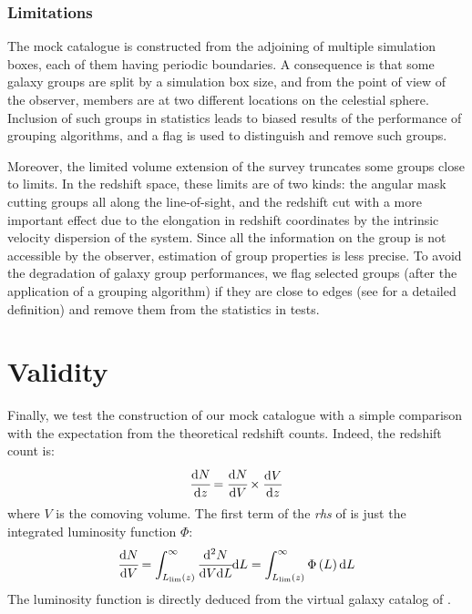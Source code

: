 \subsubsection{Limitations}
\label{ssub:galaxy_samples_limitations}

The mock catalogue is constructed from the adjoining of multiple simulation
boxes, each of them having periodic boundaries. A consequence is that some
galaxy groups are split by a simulation box size, and from the point of view of
the observer, members are at two different locations on the celestial sphere.
Inclusion of such groups in statistics leads to biased results of the
performance of grouping algorithms, and a flag is used to distinguish and
remove such groups.

Moreover, the limited volume extension of the survey truncates some groups
close to limits. In the redshift space, these limits are of two kinds: the
angular mask cutting groups all along the line-of-sight, and the redshift cut
with a more important effect due to the elongation in redshift coordinates by
the intrinsic velocity dispersion of the system. Since all the information on
the group is not accessible by the observer, estimation of group properties is
less precise. To avoid the degradation of galaxy group performances, we flag
selected groups (after the application of a grouping algorithm) if they are
close to edges (see  for a
detailed definition) and remove them from the statistics in tests.

\section{Validity}
\label{sec:validity}

Finally, we test the construction of our mock catalogue with a simple
comparison with the expectation from the theoretical redshift counts. Indeed,
the redshift count is:
%
\begin{equation}
    \label{eq:counts}
    \cfrac{{\rm{d}} N}{{\rm{d}} z} = \cfrac{{\rm{d}} N}{{\rm{d}} V}\times\frac{{\rm{d}} V}{{\rm{d}} z}
\end{equation}
%
where $V$ is the comoving volume.
The first term of the \emph{rhs} of  is just the integrated luminosity function
$\Phi$:
%
\begin{equation}
    \cfrac{{\rm{d}} N}{{\rm{d}} V} = \int_{L_{\lim} \left(z\right)}^\infty
    \cfrac{{\rm{d}}^2 N}{{\rm{d}} V {\rm{d}} L}{\rm{d}} L = \int_{L_{\lim} \left(z\right)}^\infty \Phi \left(L\right){\rm{d}} L
\end{equation}
%
The luminosity function is directly deduced from the virtual galaxy catalog of
\citet{Guo+11}.


